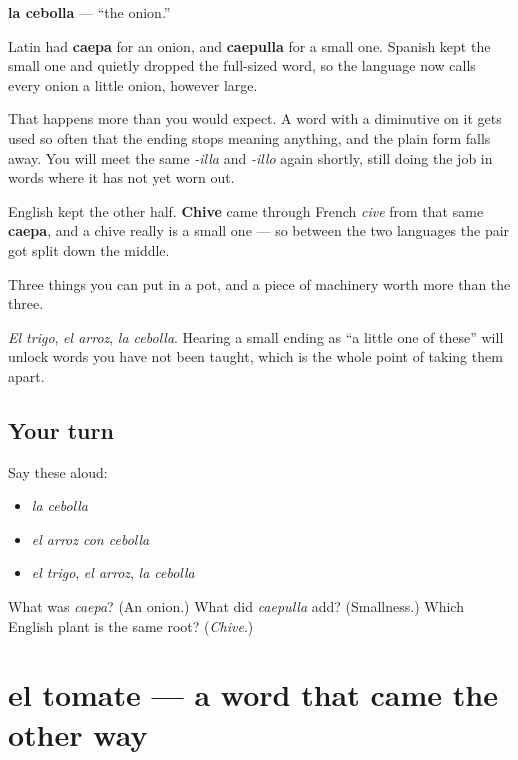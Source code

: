 \begin{cousinweb}
\textbf{la cebolla} — \textquotedblleft{}the onion.\textquotedblright{}

Latin had \textbf{caepa} for an onion, and \textbf{caepulla} for a small one. Spanish kept the small one and quietly dropped the full-sized word, so the language now calls every onion a little onion, however large.

That happens more than you would expect. A word with a diminutive on it gets used so often that the ending stops meaning anything, and the plain form falls away. You will meet the same \emph{-illa} and \emph{-illo} again shortly, still doing the job in words where it has not yet worn out.

English kept the other half. \textbf{Chive} came through French \emph{cive} from that same \textbf{caepa}, and a chive really is a small one — so between the two languages the pair got split down the middle.
\end{cousinweb}

\begin{grammarlens}[title={What you've built}]
Three things you can put in a pot, and a piece of machinery worth more than the three.

\emph{El trigo}, \emph{el arroz}, \emph{la cebolla}. Hearing a small ending as \textquotedblleft{}a little one of these\textquotedblright{} will unlock words you have not been taught, which is the whole point of taking them apart.
\end{grammarlens}

\subsection*{Your turn}
Say these aloud:

\begin{itemize}
\raggedright
  \item \emph{la cebolla}
  \item \emph{el arroz con cebolla}
  \item \emph{el trigo}, \emph{el arroz}, \emph{la cebolla}
\end{itemize}

\begin{tcolorbox}[breakable,colback=teal!4,colframe=teal!35!black,title={Before you move on}]
What was \emph{caepa}? (An onion.) What did \emph{caepulla} add? (Smallness.) Which English plant is the same root? (\emph{Chive}.)
\end{tcolorbox}
\section[el tomate]{el tomate — a word that came the other way}

